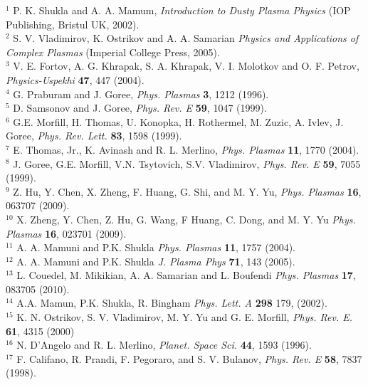 \newpage

\begin{thebibliography}{9}

$^{1}$ P. K. Shukla and A. A. Mamum, {\it Introduction to Dusty
Plasma Physics} (IOP Publishing, Bristul UK, 2002).
\\
$^{2}$ S. V. Vladimirov, K. Ostrikov and A. A. Samarian {\it Physics and Applications of Complex
Plasmas} (Imperial College Press, 2005).
\\
$^{3}$ V. E. Fortov, A. G. Khrapak, S. A. Khrapak, V. I. Molotkov
and O. F. Petrov, {\it Physics-Uspekhi} {\bf 47}, 447 (2004).
\\
$^{4}$ G. Praburam and J. Goree, {\it Phys. Plasmas} {\bf 3}, 1212 (1996).
\\
$^{5}$ D. Samsonov and J. Goree, {\it Phys. Rev. E} {\bf 59}, 1047 (1999).
\\
$^{6}$ G.E. Morfill, H. Thomas, U. Konopka, H. Rothermel, M. Zuzic,
A. Ivlev, J. Goree, {\it Phys. Rev. Lett.} {\bf83}, 1598 (1999).
\\
$^{7}$ E. Thomas, Jr., K. Avinash and R. L. Merlino, {\it Phys. Plasmas} {\bf 11}, 1770 (2004).
\\
$^{8}$ J. Goree, G.E. Morfill, V.N. Tsytovich, S.V. Vladimirov, {\it Phys.
Rev. E} {\bf 59}, 7055 (1999).
\\
$^{9}$ Z. Hu, Y. Chen, X. Zheng, F. Huang, G. Shi, and M. Y. Yu, {\it Phys. Plasmas} {\bf 16}, 063707 (2009).
\\
$^{10}$ X. Zheng, Y. Chen, Z. Hu, G. Wang, F Huang, C. Dong, and M. Y. Yu  {\it Phys. Plasmas} {\bf 16}, 023701 (2009).
\\
$^{11}$ A. A. Mamuni and P.K. Shukla {\it Phys. Plasmas} {\bf 11}, 1757 (2004).
\\
$^{12}$ A. A. Mamuni and P.K. Shukla {\it J. Plasma Phys} {\bf 71}, 143 (2005).
\\
$^{13}$ L. Couedel, M. Mikikian, A. A. Samarian and L. Boufendi {\it Phys. Plasmas} {\bf 17}, 083705 (2010).
\\
$^{14}$ A.A. Mamun, P.K. Shukla, R. Bingham {\it Phys. Lett. A} {\bf 298} 179, (2002).
\\
$^{15}$ K. N. Ostrikov, S. V. Vladimirov, M. Y. Yu and G. E.
Morfill, {\it Phys. Rev. E.} {\bf 61}, 4315 (2000)
\\
$^{16}$ N. D'Angelo and R. L. Merlino, {\it Planet. Space Sci.} {\bf
44}, 1593 (1996).
\\
$^{17}$ F. Califano, R. Prandi, F. Pegoraro, and S. V. Bulanov, {\it
Phys. Rev. E} {\bf 58}, 7837 (1998).

\end{thebibliography}

